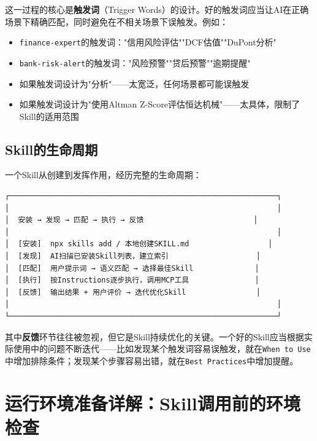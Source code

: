 这一过程的核心是\textbf{触发词}（Trigger Words）的设计。好的触发词应当让AI在正确场景下精确匹配，同时避免在不相关场景下误触发。例如：
\begin{itemize}[leftmargin=2em]
  \item \texttt{finance-expert}的触发词："信用风险评估""DCF估值""DuPont分析"
  \item \texttt{bank-risk-alert}的触发词："风险预警""贷后预警""逾期提醒"
  \item 如果触发词设计为"分析"——太宽泛，任何场景都可能误触发
  \item 如果触发词设计为"使用Altman Z-Score评估恒达机械"——太具体，限制了Skill的适用范围
\end{itemize}

\subsection{Skill的生命周期}

一个Skill从创建到发挥作用，经历完整的生命周期：

\begin{verbatim}
┌─────────────────────────────────────────────────────────────┐
│                                                             │
│  安装 → 发现 → 匹配 → 执行 → 反馈                         │
│                                                             │
│  [安装]  npx skills add / 本地创建SKILL.md                  │
│  [发现]  AI扫描已安装Skill列表，建立索引                    │
│  [匹配]  用户提示词 → 语义匹配 → 选择最佳Skill              │
│  [执行]  按Instructions逐步执行，调用MCP工具               │
│  [反馈]  输出结果 + 用户评价 → 迭代优化Skill                │
│                                                             │
└─────────────────────────────────────────────────────────────┘
\end{verbatim}

其中\textbf{反馈}环节往往被忽视，但它是Skill持续优化的关键。一个好的Skill应当根据实际使用中的问题不断迭代——比如发现某个触发词容易误触发，就在\texttt{When to Use}中增加排除条件；发现某个步骤容易出错，就在\texttt{Best Practices}中增加提醒。

\section{运行环境准备详解：Skill调用前的环境检查}


